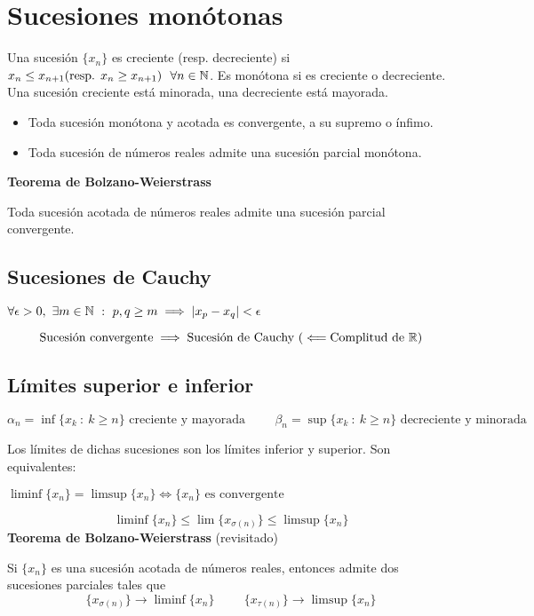 \section{Sucesiones monótonas}
Una sucesión $\{x_n\}$ es creciente (resp. decreciente) si $x_n\leq x_{n+1} \text{(resp. $x_n\geq x_{n+1} $)}\ \ \forall n\in\mathbb{N}$. Es monótona si es creciente o decreciente.
Una sucesión creciente está minorada, una decreciente está mayorada.

\begin{itemize}
	\item Toda sucesión monótona y acotada es convergente, a su supremo o  ínfimo.
	\item Toda sucesión de números reales admite una sucesión parcial monótona.
\end{itemize}

\textbf{Teorema de Bolzano-Weierstrass}

Toda sucesión acotada de números reales admite una sucesión parcial convergente.

\subsection{Sucesiones de Cauchy}
\begin{center}
$ \forall\epsilon >0, \ \exists m\in\N \ : \ p,q\geq m \implies |x_p-x_q| < \epsilon $
\end{center}
$$ \text{Sucesión convergente} \implies \text{Sucesión de Cauchy (}\Longleftarrow \text{Complitud de $\mathbb{R}$)} $$

\subsection{Límites superior e inferior}
\begin{center}
$ \alpha_n = \inf\{x_k \ : \ k\geq n\} \text{ creciente y mayorada}
\hspace{1cm}
\beta_n  = \sup\{x_k \ : \ k\geq n\} \text{ decreciente y minorada} $
\end{center}

Los límites de dichas sucesiones son los límites inferior y superior. Son equivalentes:
\begin{center}
	 $\liminf \{x_n\} = \limsup \{x_n\} 
	\Longleftrightarrow
	\{x_n\} \text{ es convergente}$
\end{center}
$$ \liminf \{x_n\} \leq \lim \{x_{\sigma (n)}\} \leq \limsup \{x_n\} $$
\textbf{Teorema de Bolzano-Weierstrass} (revisitado)

Si $\{x_n\}$ es una sucesión acotada de números reales, entonces admite dos sucesiones parciales tales que
$$ \{x_{\sigma (n)}\} \rightarrow \liminf \{x_n\} \hspace{1cm}
   \{x_{\tau   (n)}\} \rightarrow \limsup \{x_n\}$$

